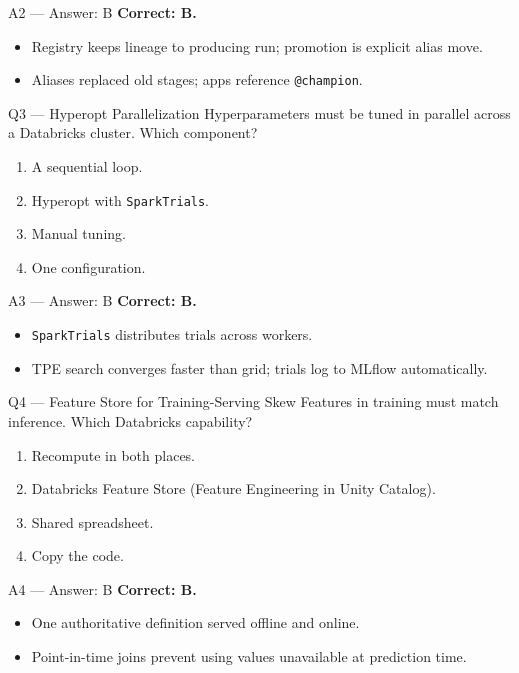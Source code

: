 \documentclass[aspectratio=169,9pt]{beamer}
\begin{document}
	\begin{frame}{A2 — Answer: B}
		\textbf{Correct: B.}
		\begin{itemize}
			\item Registry keeps lineage to producing run; promotion is explicit alias move.
			\item Aliases replaced old stages; apps reference \texttt{@champion}.
		\end{itemize}
	\end{frame}
	
	\begin{frame}{Q3 — Hyperopt Parallelization}
		Hyperparameters must be tuned in parallel across a Databricks cluster. Which component?
		\begin{enumerate}[label=\Alph*.]
			\item A sequential loop.
			\item Hyperopt with \texttt{SparkTrials}.
			\item Manual tuning.
			\item One configuration.
		\end{enumerate}
	\end{frame}
	
	\begin{frame}{A3 — Answer: B}
		\textbf{Correct: B.}
		\begin{itemize}
			\item \texttt{SparkTrials} distributes trials across workers.
			\item TPE search converges faster than grid; trials log to MLflow automatically.
		\end{itemize}
	\end{frame}
	
	\begin{frame}{Q4 — Feature Store for Training-Serving Skew}
		Features in training must match inference. Which Databricks capability?
		\begin{enumerate}[label=\Alph*.]
			\item Recompute in both places.
			\item Databricks Feature Store (Feature Engineering in Unity Catalog).
			\item Shared spreadsheet.
			\item Copy the code.
		\end{enumerate}
	\end{frame}
	
	\begin{frame}{A4 — Answer: B}
		\textbf{Correct: B.}
		\begin{itemize}
			\item One authoritative definition served offline and online.
			\item Point-in-time joins prevent using values unavailable at prediction time.
		\end{itemize}
	\end{frame}
	
\end{document}
